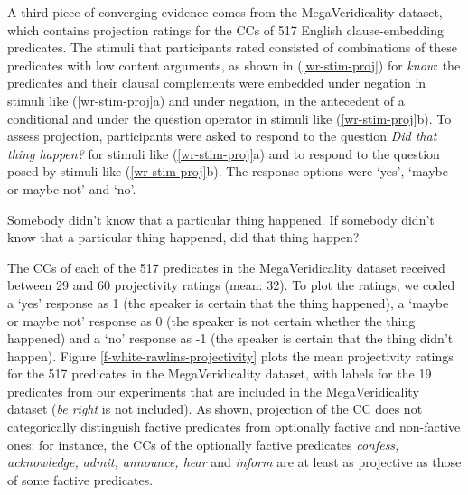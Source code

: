 \documentclass[11pt,fleqn]{article}
\newcommand{\6}{\mbox{$[\hspace*{-.6mm}[$}}
\newcommand{\9}{\mbox{$]\hspace*{-.6mm}]$}}
\begin{document}
A third piece of converging evidence comes from the MegaVeridicality dataset, which contains projection ratings for the CCs of 517 English clause-embedding predicates. The stimuli that participants rated consisted of combinations of these predicates with low content arguments, as shown in (\ref{wr-stim-proj}) for {\em know}: the predicates and their clausal complements were embedded under negation in stimuli like (\ref{wr-stim-proj}a) and under negation, in the antecedent of a conditional and under the question operator in stimuli like (\ref{wr-stim-proj}b). To assess projection, participants were asked to respond to the question {\em Did that thing happen?} for stimuli like (\ref{wr-stim-proj}a) and to respond to the question posed by stimuli like (\ref{wr-stim-proj}b). The response options were `yes', `maybe or maybe not' and `no'. 

\begin{exe}
\ex\label{wr-stim-proj}
\begin{xlist}
\ex Somebody didn't know that a particular thing happened.
\ex If somebody didn't know that a particular thing happened, did that thing happen?
\end{xlist}
\end{exe}

The CCs of each of the 517 predicates in the MegaVeridicality dataset received between 29 and 60 projectivity ratings (mean: 32). To plot the ratings, we coded a `yes' response as 1 (the speaker is certain that the thing happened),  a `maybe or maybe not' response as 0 (the speaker is not certain whether the thing happened) and a `no' response as -1 (the speaker is certain that the thing didn't happen). Figure \ref{f-white-rawlins-projectivity} plots the mean projectivity ratings for the 517 predicates in the MegaVeridicality dataset, with labels for the 19 predicates from our experiments that are included in the MegaVeridicality dataset ({\em be right} is not included). As shown, projection of the CC does not categorically distinguish factive predicates from optionally factive and non-factive ones: for instance, the CCs of the optionally factive predicates {\em confess, acknowledge, admit, announce, hear} and {\em inform} are at least as projective as those of some factive predicates. 
\end{document}
